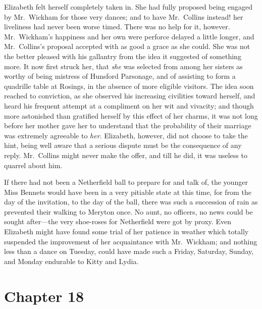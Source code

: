 Elizabeth felt herself completely taken in.  She had fully
proposed being engaged by Mr.\ Wickham for those very dances;
and to have Mr.\ Collins instead! her liveliness had never been
worse timed.  There was no help for it, however.  Mr.\ Wickham's
happiness and her own were perforce delayed a little longer,
and Mr.\ Collins's proposal accepted with as good a grace as she
could.  She was not the better pleased with his gallantry from
the idea it suggested of something more.  It now first struck
her, that \emph{she} was selected from among her sisters as worthy of
being mistress of Hunsford Parsonage, and of assisting to form
a quadrille table at Rosings, in the absence of more eligible
visitors.  The idea soon reached to conviction, as she observed
his increasing civilities toward herself, and heard his
frequent attempt at a compliment on her wit and vivacity; and
though more astonished than gratified herself by this effect
of her charms, it was not long before her mother gave her to
understand that the probability of their marriage was extremely
agreeable to \emph{her}.  Elizabeth, however, did not choose to take
the hint, being well aware that a serious dispute must be the
consequence of any reply.  Mr.\ Collins might never make the
offer, and till he did, it was useless to quarrel about him.

If there had not been a Netherfield ball to prepare for and talk
of, the younger Miss Bennets would have been in a very pitiable
state at this time, for from the day of the invitation, to the day
of the ball, there was such a succession of rain as prevented their
walking to Meryton once.  No aunt, no officers, no news could
be sought after---the very shoe-roses for Netherfield were got
by proxy.  Even Elizabeth might have found some trial of her
patience in weather which totally suspended the improvement of
her acquaintance with Mr.\ Wickham; and nothing less than a
dance on Tuesday, could have made such a Friday, Saturday,
Sunday, and Monday endurable to Kitty and Lydia.



\chapter{Chapter 18}


